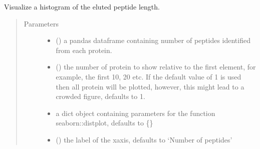 \documentclass[letterpaper,10pt,english]{sphinxmanual}
\begin{document}
\begin{fulllineitems}
\label{\detokenize{IPTK.Visualization:IPTK.Visualization.vizTools.plot_num_peptides_per_parent}}
Visualize a histogram of the eluted peptide length.
\begin{quote}\begin{description}
\item[{Parameters}] \leavevmode\begin{itemize}
\item {} 
 () \textendash{} a pandas dataframe containing number of peptides identified from each protein.

\item {} 
 (\sphinxstyleliteralemphasis{\sphinxupquote{, }}) \textendash{} the number of protein to show relative to the first element, for example, the first 10, 20 etc.     If the default value of \sphinxhyphen{}1 is used then all protein will be plotted, however, this might lead to a crowded figure,     defaults to \sphinxhyphen{}1.

\item {} 
 \textendash{} a dict object containing parameters for the function     seaborn::distplot, defaults to \{\}

\item {} 
 (\sphinxstyleliteralemphasis{\sphinxupquote{, }}) \textendash{} the label of the x\sphinxhyphen{}axis, defaults to ‘Number of peptides’


\end{itemize}
\end{description}
\end{quote}
\end{fulllineitems}
\end{document}
